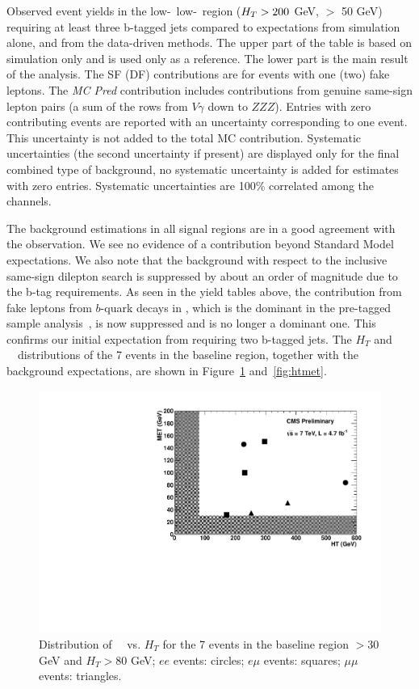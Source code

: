 \clearpage

\begin{table}[hbt]
\begin{center}

\end{center}
\caption{\label{tab:yield_ht200met503btag}Observed event yields in the low-\Ht\ low-\met\ region
($H_T > 200$ GeV, \met $>$ 50 GeV) requiring at least three b-tagged jets
compared to expectations from simulation alone, and from the data-driven methods.
The upper part of the table is based on simulation only and is used only as a reference.
The lower part is the main result of the analysis.
The SF (DF) contributions are for events with one (two) fake leptons.
The {\em MC Pred} contribution includes contributions from genuine  same-sign lepton
pairs (a sum of the rows from $V\gamma$ down to $ZZZ$).
Entries with zero contributing events are reported with an uncertainty corresponding to one event.
This uncertainty is not added to the total MC contribution.
Systematic uncertainties (the second uncertainty if present)
 are displayed only for the final combined type of background, no systematic
uncertainty is added for estimates with zero entries.
Systematic uncertainties are 100\% correlated among the channels.
}
\end{table}

\clearpage

The background estimations in all signal regions
are in a good agreement with the observation.  We see no evidence of 
a contribution beyond Standard Model expectations.
We also note that the background with respect to the inclusive same-sign
dilepton search is suppressed by about
an order of magnitude due to the b-tag requirements.
As seen in the yield tables above, the 
contribution from fake leptons from $b$-quark decays in \ttbar,
which is the dominant in the pre-tagged sample analysis~\cite{ssnote2011},
is now suppressed and is no longer a dominant one.
This confirms our initial expectation from requiring two b-tagged jets.
The $H_T$ and \met~~distributions of the 7 events 
in the baseline region,
together with the background expectations, are shown in 
Figure~\ref{fig:htvsmet} and~\ref{fig:htmet}.

\begin{figure}[h]
\begin{center}
\includegraphics[width=0.48\linewidth]{figs/MetVsHt.pdf}
\caption{\label{fig:htvsmet}
Distribution of \met~~vs. $H_T$ for the 7 events in the baseline region
\met$> 30$ GeV and $H_T > 80$ GeV; $ee$ events: circles; $e\mu$ events: 
squares; $\mu\mu$ events: triangles.}
\end{center}
\end{figure}

